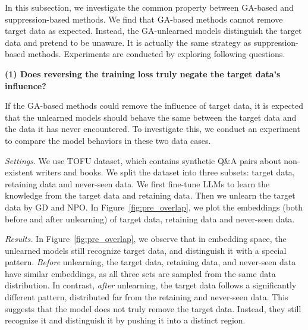 In this subsection, we investigate the common property between GA-based and suppression-based methods. 
We find that GA-based methods cannot remove target data as expected. Instead, the GA-unlearned models distinguish the target data and pretend to be unaware. It is actually the same strategy as suppression-based methods. 
Experiments are conducted by exploring following questions.



\noindent\textbf{(1) Does reversing the training loss truly negate the target data's influence?} 

If the GA-based methods could remove the influence of target data, it is expected that the unlearned models should behave the same between the target data and the data it has never encountered.
To investigate this, we conduct an experiment to compare the model behaviors in these two data cases. 


\textit{Settings}.
We use TOFU dataset, which contains synthetic Q\&A pairs about non-existent writers and books. 
We split the dataset into three subsets: target data, retaining data and never-seen data.
We first fine-tune LLMs to learn the knowledge from the target data and retaining data. Then we unlearn the target data by GD and NPO. In Figure~\ref{fig:pre_overlap}, 
we plot the embeddings (both before and after unlearning) of target data, retaining data and never-seen data.


\textit{Results.} In Figure~\ref{fig:pre_overlap}, we observe that in embedding space, the unlearned models still recognize target data, and distinguish it with a special pattern. 
\textit{Before} unlearning, the target data, retaining data, and never-seen data have similar embeddings, as all three sets are sampled from the same data distribution. In contrast, \textit{after} unlearning, the target data follows a significantly different pattern, distributed far from the retaining and never-seen data. This suggests that the model does not truly remove the target data. Instead, they still recognize it and distinguish it by pushing it into a distinct region.


